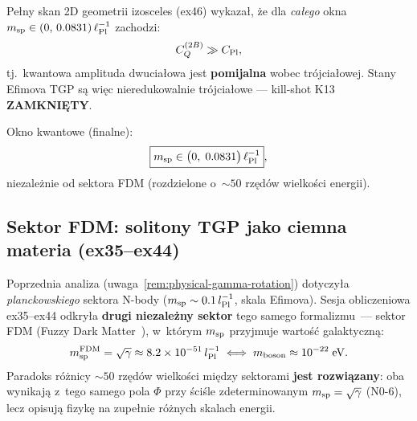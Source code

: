 \begin{remark}%
\label{rem:ex46-k13}
Pe\l{}ny skan 2D geometrii izosceles (ex46) wykaza\l{},
\.ze dla \emph{ca\l{}ego} okna $m_{\rm sp} \in (0,\, 0.0831)\,\ell_{\rm Pl}^{-1}$
zachodzi:
\begin{equation}\label{eq:k13-result}
  C_Q^{(2B)} \gg C_{\rm Pl},
\end{equation}
tj.\ kwantowa amplituda dwucia\l{}owa jest \textbf{pomijalna}
wobec tr\'ojcia\l{}owej.
Stany Efimova TGP s\k{a} wi\k{e}c nieredukowalnie tr\'ojcia\l{}owe
--- kill-shot K13 \textbf{ZAMKNI\k{E}TY}.

Okno kwantowe (finalne):
\begin{equation}\label{eq:efimov-window}
  \boxed{m_{\rm sp} \in \bigl(0,\; 0.0831\bigr)\,\ell_{\rm Pl}^{-1}},
\end{equation}
niezale\.znie od sektora FDM
(rozdzielone o~$\sim\!50$ rz\k{e}d\'ow wielko\'sci energii).
\end{remark}

\subsection{Sektor FDM: solitony TGP jako ciemna materia (ex35--ex44)}%
\label{ssec:fdm-sector}

\begin{remark}%
\label{rem:two-sectors}
Poprzednia analiza (uwaga~\ref{rem:physical-gamma-rotation}) dotyczy\l{}a
\emph{planckowskiego} sektora N-body ($m_{\rm sp} \sim 0.1\,l_{\rm Pl}^{-1}$,
skala Efimova). Sesja obliczeniowa ex35--ex44 odkry\l{}a \textbf{drugi
niezale\.zny sektor} tego samego formalizmu~--- sektor FDM
(Fuzzy Dark Matter~\cite{Hu2000,Schive2014}), w~kt\'orym $m_{\rm sp}$
przyjmuje warto\'s\'c galaktyczn\k{a}:
\begin{equation}
  m_{\rm sp}^{\rm FDM} = \sqrt{\gamma} \approx 8.2\times10^{-51}\,l_{\rm Pl}^{-1}
  \;\Longleftrightarrow\;
  m_{\rm boson} \approx 10^{-22}\;\mathrm{eV}.
\end{equation}
Paradoks r\'o\.znicy $\sim 50$ rz\k{e}d\'ow wielko\'sci mi\k{e}dzy
sektorami \textbf{jest rozwi\k{a}zany}: oba wynikaj\k{a} z~tego samego
pola $\Phi$ przy \'sci\'sle zdeterminowanym $m_{\rm sp} = \sqrt{\gamma}$
(N0-6), lecz opisuj\k{a} fizyk\k{e} na zupe\l{}nie r\'o\.znych skalach
energii.
\end{remark}

